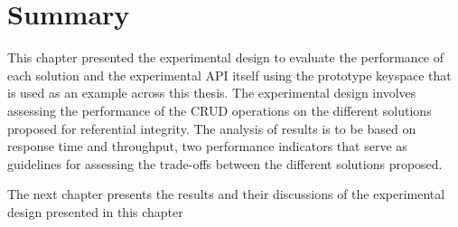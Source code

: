 \section{Summary} \label{sexp:Summary} 

This chapter  presented the experimental design to evaluate the performance of
each  solution and the experimental \ac{API} itself using the prototype keyspace
that is used as an example across this thesis.  The experimental design involves
assessing the performance of the CRUD operations on the different solutions
proposed for referential integrity. 
The analysis of results is to be based on response time and throughput,  two
performance indicators that serve as guidelines for assessing the trade-offs
between the different solutions proposed. 
	
	
The next chapter presents the results and their discussions of the experimental
design presented in this chapter
 






